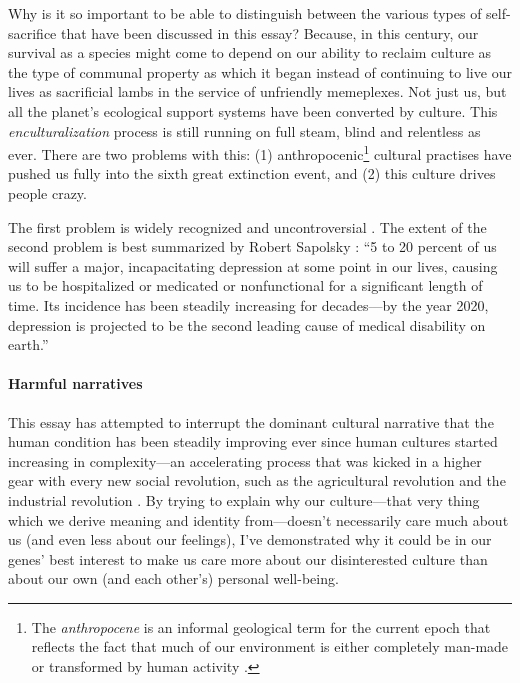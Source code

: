 \documentclass{article}
\begin{document}
Why is it so important to be able to distinguish between the various types
of self-sacrifice that have been discussed in this essay? Because, in this century,
our survival as a species might come to depend on our ability to reclaim culture
as the type of communal property as which it began instead of continuing to live
our lives as sacrificial lambs in the service of unfriendly memeplexes. Not
just us, but all the planet's ecological support systems have been converted by
culture. This \textit{enculturalization} process is still running on full
steam, blind and relentless as ever. There are two problems with this: (1)
anthropocenic\footnote{The \emph{anthropocene} is an informal geological term
for the current epoch that reflects the fact that much of our environment is
either completely man-made or transformed by human activity
\citep{revkin2011}.} cultural practises have pushed us fully into the sixth
great extinction event, and (2) this culture drives people crazy.

The first problem is widely recognized and uncontroversial \citep{iucn2009,
pimm1995}. The extent of the second problem is best summarized by Robert
Sapolsky \citeyearpar[ch.~14]{sapolsky2004}: “5 to 20 percent of us will suffer
a major, incapacitating depression at some point in our lives, causing us to be
hospitalized or medicated or nonfunctional for a significant length of time.
Its incidence has been steadily increasing for decades---by the year 2020,
depression is projected to be the second leading cause of medical disability on
earth.”

\paragraph{Harmful narratives}

This essay has attempted to interrupt the dominant cultural narrative that the
human condition has been steadily improving ever since human cultures started
increasing in complexity---an accelerating process that was kicked in a higher
gear with every new social revolution, such as the agricultural revolution and
the industrial revolution \citep{botton2013, quinn1992}. By trying to explain
why our culture---that very thing which we derive meaning and identity
from---doesn't necessarily care much about us (and even less about our
feelings), I've demonstrated why it could be in our genes' best interest to
make us care more about our disinterested culture than about our own (and each
other's) personal well-being.
\end{document}
